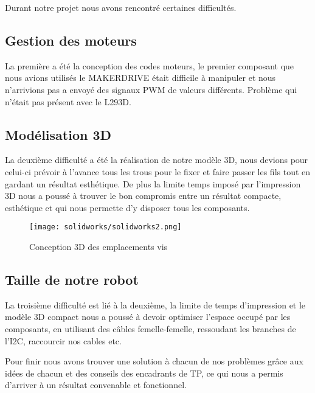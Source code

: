 Durant notre projet nous avons rencontré certaines difficultés.

\subsection{Gestion des moteurs}
La première a été la conception des codes moteurs, le premier composant que nous avions utilisés le MAKERDRIVE était difficile à manipuler et nous n'arrivions pas a envoyé des signaux PWM de valeurs différents. Problème qui n'était pas présent avec le L293D.

\subsection{Modélisation 3D}
La deuxième difficulté a été la réalisation de notre modèle 3D, nous devions pour celui-ci prévoir à l'avance tous les trous pour le fixer et faire passer les fils tout en gardant un résultat esthétique. De plus la limite temps imposé par l'impression 3D nous a poussé à trouver le bon compromis entre un résultat compacte, esthétique et qui nous permette d'y disposer tous les composants.

\begin{figure}[h]
    \centering
    \texttt{[image: solidworks/solidworks2.png]}
    \caption{Conception 3D des emplacements vis}
    \label{fig:Conception 3D emplacements vis}
\end{figure}

\subsection{Taille de notre robot}
La troisième difficulté est lié à la deuxième, la limite de temps d'impression et le modèle 3D compact nous a poussé à devoir optimiser l'espace occupé par les composants, en utilisant des câbles femelle-femelle, ressoudant les branches de l'I2C, raccourcir nos cables etc.

Pour finir nous avons trouver une solution à chacun de nos problèmes grâce aux idées de chacun et des conseils des encadrants de TP, ce qui nous a permis d'arriver à un résultat convenable et fonctionnel.

\newpage
